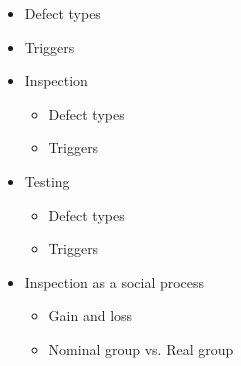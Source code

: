 		\begin{itemize}
			\item Defect types
			\item Triggers
			\item Inspection
				\begin{itemize}
					\item Defect types
					\item Triggers
				\end{itemize}
			\item Testing
				\begin{itemize}
					\item Defect types
					\item Triggers
				\end{itemize}
			\item Inspection as a social process
				\begin{itemize}
					\item Gain and loss
					\item Nominal group vs. Real group
				\end{itemize}
		\end{itemize}

